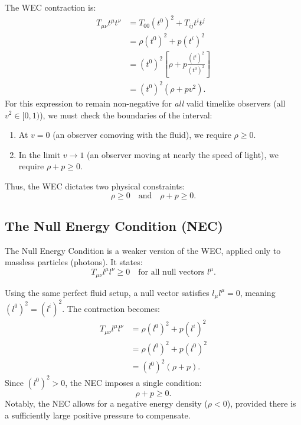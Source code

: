 \documentclass[11pt, a4paper]{report}
\begin{document}
The WEC contraction is:
\begin{align}
T_{\mu\nu} t^{\mu} t^{\nu} &= T_{00}(t^{0})^{2} + T_{ij}t^{i}t^{j} \nonumber \\
&= \rho(t^{0})^{2} + p(t^{i})^{2} \nonumber \\
&= (t^{0})^{2} \left[ \rho + p \frac{(t^{i})^{2}}{(t^{0})^{2}} \right] \nonumber \\
&= (t^{0})^{2} (\rho + p v^{2}).
\end{align}
For this expression to remain non-negative for \textit{all} valid timelike observers (all $v^{2} \in [0, 1)$), we must check the boundaries of the interval:
\begin{enumerate}
    \item At $v = 0$ (an observer comoving with the fluid), we require $\rho \ge 0$.
    \item In the limit $v \to 1$ (an observer moving at nearly the speed of light), we require $\rho + p \ge 0$.
\end{enumerate}
Thus, the WEC dictates two physical constraints:
\begin{equation}
\rho \ge 0 \quad \text{and} \quad \rho + p \ge 0.
\end{equation}

\subsection{The Null Energy Condition (NEC)}

The Null Energy Condition is a weaker version of the WEC, applied only to massless particles (photons). It states:
\begin{equation}
T_{\mu\nu} l^{\mu} l^{\nu} \ge 0 \quad \text{for all null vectors } l^{\mu}.
\end{equation}

Using the same perfect fluid setup, a null vector satisfies $l_{\mu}l^{\mu} = 0$, meaning $(l^{0})^{2} = (l^{i})^{2}$. The contraction becomes:
\begin{align}
T_{\mu\nu} l^{\mu} l^{\nu} &= \rho(l^{0})^{2} + p(l^{i})^{2} \nonumber \\
&= \rho(l^{0})^{2} + p(l^{0})^{2} \nonumber \\
&= (l^{0})^{2}(\rho + p).
\end{align}
Since $(l^{0})^{2} > 0$, the NEC imposes a single condition:
\begin{equation}
\rho + p \ge 0.
\end{equation}
Notably, the NEC allows for a negative energy density ($\rho < 0$), provided there is a sufficiently large positive pressure to compensate.
\end{document}
